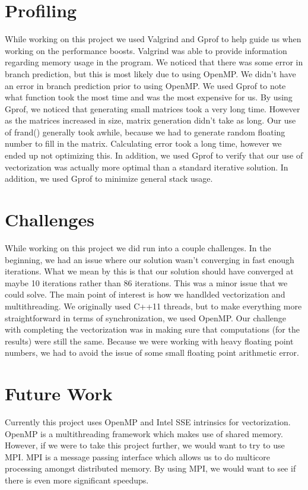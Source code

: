 \documentclass[10pt]{article}
\begin{document}
\section{Profiling}
\label{profiling}
\sf While working on this project we used Valgrind and Gprof to help guide us when working
on the performance boosts. Valgrind was able to provide information regarding memory usage
in the program. We noticed that there was some error in branch prediction, but this is
most likely due to using OpenMP. We didn't have an error in branch prediction prior
to using OpenMP. We used Gprof to note what function took the most time and was the
most expensive for us. By using Gprof, we noticed that generating small matrices
took a very long time. However as the matrices increased in size, matrix generation
didn't take as long. Our use of frand() generally took awhile, because we had to generate
random floating number to fill in the matrix. Calculating error took a long time,
however we ended up not optimizing this. In addition, we used Gprof to verify that
our use of vectorization was actually more optimal than a standard iterative solution.
In addition, we used Gprof to minimize general stack usage. 

\section{Challenges}
\label{challenges}
\sf While working on this project we did run into a couple challenges. In the beginning,
we had an issue where our solution wasn't converging in fast enough iterations. What
we mean by this is that our solution should have converged at maybe 10 iterations rather than 86
iterations. This was a minor issue that we could solve. The main point of interest is how we handlded
vectorization and multithreading. We originally used C++11 threads, but to make everything more
straightforward in terms of synchronization, we used OpenMP. Our challenge with completing the
vectorization was in making sure that computations (for the results) were still the same. Because
we were working with heavy floating point numbers, we had to avoid the issue of some small
floating point arithmetic error.

\section{Future Work}
\label{futureWork}
\sf Currently this project uses OpenMP and Intel SSE intrinsics for vectorization. OpenMP
is a multithreading framework which makes use of shared memory. However, if we were to take
this project further, we would want to try to use MPI. MPI is a message passing interface
which allows us to do multicore processing amongst distributed memory. By using MPI,
we would want to see if there is even more significant speedups.
\end{document}
